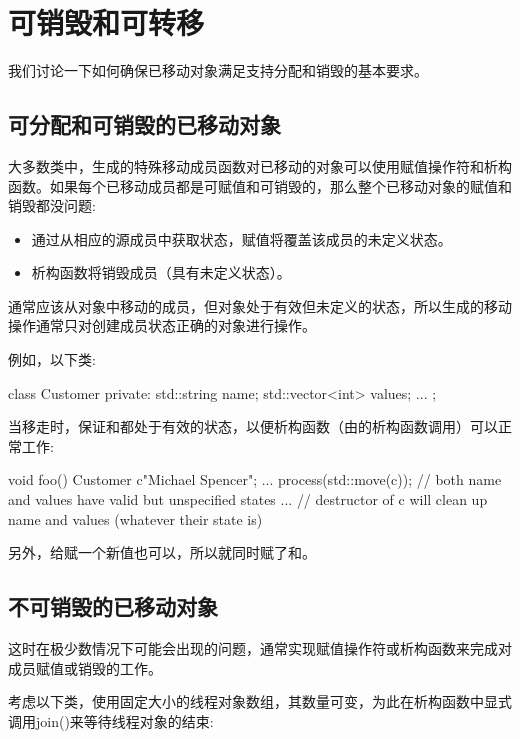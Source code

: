 \section{可销毁和可转移}
我们讨论一下如何确保已移动对象满足支持分配和销毁的基本要求。

\subsection{可分配和可销毁的已移动对象}

大多数类中，生成的特殊移动成员函数对已移动的对象可以使用赋值操作符和析构函数。如果每个已移动成员都是可赋值和可销毁的，那么整个已移动对象的赋值和销毁都没问题:

\begin{itemize}
	\item 通过从相应的源成员中获取状态，赋值将覆盖该成员的未定义状态。
	\item 析构函数将销毁成员（具有未定义状态）。
\end{itemize}

通常应该从对象中移动的成员，但对象处于有效但未定义的状态，所以生成的移动操作通常只对创建成员状态正确的对象进行操作。

例如，以下类:

\begin{cppcode}
class Customer {
private:
	std::string name;
	std::vector<int> values;
	...
};
\end{cppcode}

当移走时，保证和都处于有效的状态，以便析构函数（由的析构函数调用）可以正常工作:

\begin{cppcode}
void foo()
{
	Customer c{"Michael Spencer"};
	...
	process(std::move(c));
	// both name and values have valid but unspecified states
	...
} // destructor of c will clean up name and values (whatever their state is)
\end{cppcode}

另外，给赋一个新值也可以，所以就同时赋了和。

\subsection{不可销毁的已移动对象}

这时在极少数情况下可能会出现的问题，通常实现赋值操作符或析构函数来完成对成员赋值或销毁的工作。

考虑以下类，使用固定大小的线程对象数组，其数量可变，为此在析构函数中显式调用join()来等待线程对象的结束:

